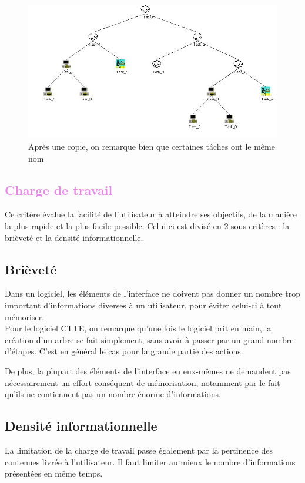\documentclass[12pt, a4paper]{article}
\begin{document}
\begin{figure}[h]
\begin{center}
   \includegraphics[scale = 0.7]{copierate.jpg}
	\caption{Après une copie, on remarque bien que certaines tâches ont le même nom}
	\end{center}
\end{figure}
\newpage
\textcolor{Violet}{\section{Charge de travail}}
Ce critère évalue la facilité de l'utilisateur à atteindre ses objectifs, de la manière la plus rapide et la plus facile possible. Celui-ci est divisé en 2 sous-critères : la brièveté et la densité informationnelle.

\textcolor{NavyBlue}{\subsection{Brièveté}}
Dans un logiciel, les éléments de l'interface ne doivent pas donner un nombre trop important d'informations diverses à un utilisateur, pour éviter celui-ci à tout mémoriser.\\


Pour le logiciel CTTE, on remarque qu'une fois le logiciel prit en main, la création d'un arbre se fait simplement, sans avoir à passer par un grand nombre d'étapes. C'est en général le cas pour la grande partie des actions. 


De plus, la plupart des éléments de l'interface en eux-mêmes ne demandent pas nécessairement un effort conséquent de mémorisation, notamment par le fait qu'ils ne contiennent pas un nombre énorme d'informations.

\textcolor{NavyBlue}{\subsection{Densité informationnelle}}
La limitation de la charge de travail passe également par la pertinence des contenues livrée à l'utilisateur. Il faut limiter au mieux le nombre d'informations présentées en même temps.\\
\end{document}
